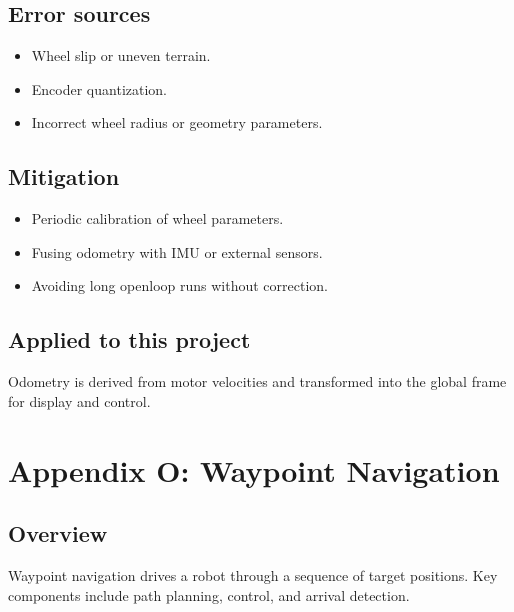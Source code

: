 \documentclass[letterpaper,10pt,english]{sphinxmanual}
\begin{document}
\section{Error sources}
\label{\detokenize{appendix_n_odometry:error-sources}}\begin{itemize}
\item {} 
\sphinxAtStartPar
Wheel slip or uneven terrain.

\item {} 
\sphinxAtStartPar
Encoder quantization.

\item {} 
\sphinxAtStartPar
Incorrect wheel radius or geometry parameters.

\end{itemize}


\section{Mitigation}
\label{\detokenize{appendix_n_odometry:mitigation}}\begin{itemize}
\item {} 
\sphinxAtStartPar
Periodic calibration of wheel parameters.

\item {} 
\sphinxAtStartPar
Fusing odometry with IMU or external sensors.

\item {} 
\sphinxAtStartPar
Avoiding long open\sphinxhyphen{}loop runs without correction.

\end{itemize}


\section{Applied to this project}
\label{\detokenize{appendix_n_odometry:applied-to-this-project}}
\sphinxAtStartPar
Odometry is derived from motor velocities and transformed into the global frame
for display and control.


\chapter{Appendix O: Waypoint Navigation}
\label{\detokenize{appendix_o_waypoint_navigation:appendix-o-waypoint-navigation}}\label{\detokenize{appendix_o_waypoint_navigation::doc}}

\section{Overview}
\label{\detokenize{appendix_o_waypoint_navigation:overview}}
\sphinxAtStartPar
Waypoint navigation drives a robot through a sequence of target positions.
Key components include path planning, control, and arrival detection.
\end{document}
